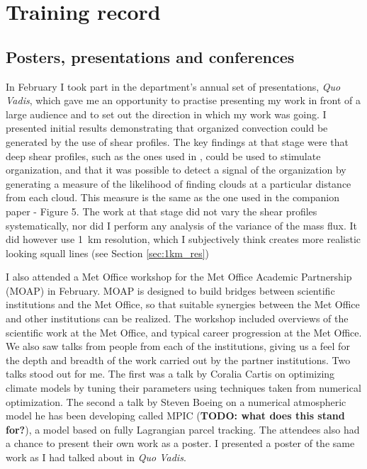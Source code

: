\documentclass[11pt,a4paper]{article}
\newcommand\todo[1]{\textbf{TODO: #1}}
\begin{document}
\section{Training record}
\label{sec:Training record}

\subsection{Posters, presentations and conferences}

In February I took part in the department's annual set of presentations, \textit{Quo Vadis}, which gave me an opportunity to practise presenting my work in front of a large audience and to set out the direction in which my work was going. I presented initial results demonstrating that organized convection could be generated by the use of shear profiles. The key findings at that stage were that deep shear profiles, such as the ones used in \cite{cohen2006fluctuations}, could be used to stimulate organization, and that it was possible to detect a signal of the organization by generating a measure of the likelihood of finding clouds at a particular distance from each cloud. This measure is the same as the one used in the companion paper \cite{muetz2017effects} - Figure 5. The work at that stage did not vary the shear profiles systematically, nor did I perform any analysis of the variance of the mass flux. It did however use \SI{1}{km} resolution, which I subjectively think creates more realistic looking squall lines (see Section \ref{sec:1km_res})

I also attended a Met Office workshop for the Met Office Academic Partnership (MOAP) in February. MOAP is designed to build bridges between scientific institutions and the Met Office, so that suitable synergies between the Met Office and other institutions can be realized. The workshop included overviews of the scientific work at the Met Office, and typical career progression at the Met Office. We also saw talks from people from each of the institutions, giving us a feel for the depth and breadth of the work carried out by the partner institutions. Two talks stood out for me. The first was a talk by Coralia Cartis on optimizing climate models by tuning their parameters using techniques taken from numerical optimization. The second a talk by Steven Boeing on a numerical atmospheric model he has been developing called MPIC (\todo{what does this stand for?}), a model based on fully Lagrangian parcel tracking. The attendees also had a chance to present their own work as a poster. I presented a poster of the same work as I had talked about in \textit{Quo Vadis}.
\end{document}
